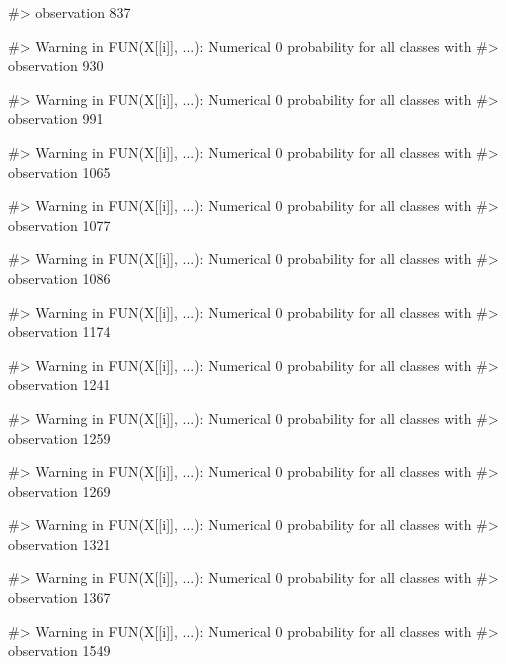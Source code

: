 \begin{Schunk}
\begin{Soutput}
#> observation 837
\end{Soutput}
\begin{Soutput}
#> Warning in FUN(X[[i]], ...): Numerical 0 probability for all classes with
#> observation 930
\end{Soutput}
\begin{Soutput}
#> Warning in FUN(X[[i]], ...): Numerical 0 probability for all classes with
#> observation 991
\end{Soutput}
\begin{Soutput}
#> Warning in FUN(X[[i]], ...): Numerical 0 probability for all classes with
#> observation 1065
\end{Soutput}
\begin{Soutput}
#> Warning in FUN(X[[i]], ...): Numerical 0 probability for all classes with
#> observation 1077
\end{Soutput}
\begin{Soutput}
#> Warning in FUN(X[[i]], ...): Numerical 0 probability for all classes with
#> observation 1086
\end{Soutput}
\begin{Soutput}
#> Warning in FUN(X[[i]], ...): Numerical 0 probability for all classes with
#> observation 1174
\end{Soutput}
\begin{Soutput}
#> Warning in FUN(X[[i]], ...): Numerical 0 probability for all classes with
#> observation 1241
\end{Soutput}
\begin{Soutput}
#> Warning in FUN(X[[i]], ...): Numerical 0 probability for all classes with
#> observation 1259
\end{Soutput}
\begin{Soutput}
#> Warning in FUN(X[[i]], ...): Numerical 0 probability for all classes with
#> observation 1269
\end{Soutput}
\begin{Soutput}
#> Warning in FUN(X[[i]], ...): Numerical 0 probability for all classes with
#> observation 1321
\end{Soutput}
\begin{Soutput}
#> Warning in FUN(X[[i]], ...): Numerical 0 probability for all classes with
#> observation 1367
\end{Soutput}
\begin{Soutput}
#> Warning in FUN(X[[i]], ...): Numerical 0 probability for all classes with
#> observation 1549
\end{Soutput}
\begin{Soutput}

\end{Soutput}
\end{Schunk}
